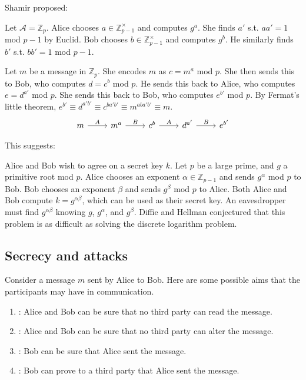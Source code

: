 Shamir proposed:
\begin{example}
    Let $\mathcal A = \mathbb Z_p$.
    Alice chooses $a \in \mathbb Z_{p-1}^\times$ and computes $g^a$.
    She finds $a'$ s.t. $aa' = 1$ mod $p-1$ by Euclid.
    Bob chooses $b \in \mathbb Z_{p-1}^\times$ and computes $g^b$.
    He similarly finds $b'$ s.t. $bb' = 1$ mod $p-1$.

    Let $m$ be a message in $\mathbb Z_p$.
    She encodes $m$ as $c = m^a$ mod $p$.
    She then sends this to Bob, who computes $d = c^b$ mod $p$.
    He sends this back to Alice, who computes $e = d^{a'}$ mod $p$.
    She sends this back to Bob, who computes $e^{b'}$ mod $p$.
    By Fermat's little theorem, $e^{b'} \equiv d^{a'b'} \equiv c^{ba'b'} \equiv m^{aba'b'} \equiv m$.
    \[
        \begin{tikzcd}
            m & {m^a} & {c^b} & {d^{a'}} & {e^{b'}}
            \arrow["A", from=1-1, to=1-2]
            \arrow["B", from=1-2, to=1-3]
            \arrow["A", from=1-3, to=1-4]
            \arrow["B", from=1-4, to=1-5]
        \end{tikzcd}
    \]
\end{example}
This suggests:
\begin{example}
    Alice and Bob wish to agree on a secret key $k$.
    Let $p$ be a large prime, and $g$ a primitive root mod $p$.
    Alice chooses an exponent $\alpha \in \mathbb Z_{p-1}$ and sends $g^\alpha$ mod $p$ to Bob.
    Bob chooses an exponent $\beta$ and sends $g^\beta$ mod $p$ to Alice.
    Both Alice and Bob compute $k = g^{\alpha\beta}$, which can be used as their secret key.
    An eavesdropper must find $g^{\alpha\beta}$ knowing $g$, $g^{\alpha}$, and $g^{\beta}$.
    Diffie and Hellman conjectured that this problem is as difficult as solving the discrete logarithm problem.
\end{example}

\subsection{Secrecy and attacks}
Consider a message $m$ sent by Alice to Bob.
Here are some possible aims that the participants may have in communication.

\begin{enumerate}
    \item {}: Alice and Bob can be sure that no third party can read the message.
    \item {}: Alice and Bob can be sure that no third party can alter the message.
    \item {}: Bob can be sure that Alice sent the message.
    \item {}: Bob can prove to a third party that Alice sent the message.
\end{enumerate}

